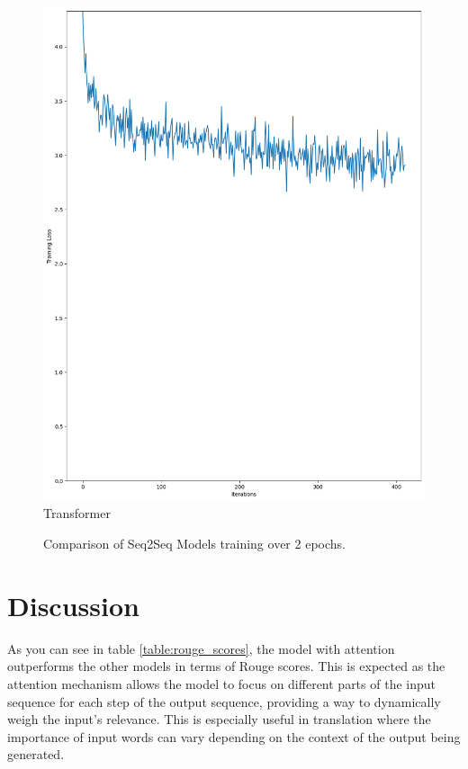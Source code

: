 \documentclass{article}
\begin{document}
\begin{figure}[htbp]
\begin{minipage}[t]{0.19\textwidth}
        \includegraphics[width=\textwidth]{img/Transformer_learning.png} \\
        \caption{Transformer}
        \label{fig:transformer}
    \end{minipage}
    \caption{Comparison of Seq2Seq Models training over 2 epochs.}
    \label{fig:seq2seq_models}
\end{figure}

\section{Discussion}

As you can see in table \ref{table:rouge_scores}, the model with attention outperforms the other models in terms of Rouge scores. This is expected as the attention mechanism allows the model to focus on different parts of the input sequence for each step of the output sequence, providing a way to dynamically weigh the input's relevance. This is especially useful in translation where the importance of input words can vary depending on the context of the output being generated.
\end{document}
